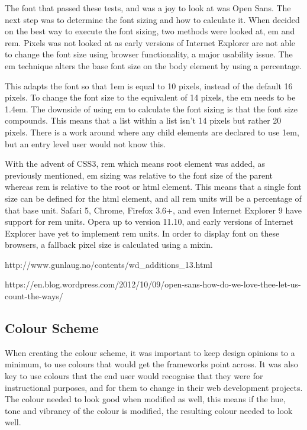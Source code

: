 The font that passed these tests, and was a joy to look at was Open Sans. The next step was to determine the font sizing and how to calculate it. When decided on the best way to execute the font sizing, two methods were looked at, em and rem. Pixels was not looked at as early versions of Internet Explorer are not able to change the font size using browser functionality, a major usability issue. The em technique alters the base font size on the body element by using a percentage. 

This adapts the font so that 1em is equal to 10 pixels, instead of the default 16 pixels. To change the font size to the equivalent of 14 pixels, the em needs to be 1.4em. The downside of using em to calculate the font sizing is that the font size compounds. This means that a list within a list isn't 14 pixels but rather 20 pixels. There is a work around where any child elements are declared to use 1em, but an entry level user would not know this. 

With the advent of CSS3, rem which means root element was added, as previously mentioned, em sizing was relative to the font size of the parent whereas rem is relative to the root or html element. This means that a single font size can be defined for the html element, and all rem units will be a percentage of that base unit. Safari 5, Chrome, Firefox 3.6+, and even Internet Explorer 9 have support for rem units. Opera up to version 11.10, and early versions of Internet Explorer have yet to implement rem units. In order to display font on these browsers, a fallback pixel size is calculated using a mixin. 


http://www.gunlaug.no/contents/wd_additions_13.html

https://en.blog.wordpress.com/2012/10/09/open-sans-how-do-we-love-thee-let-us-count-the-ways/


\subsection{Colour Scheme}
When creating the colour scheme, it was important to keep design opinions to a minimum, to use colours that would get the frameworks point across. It was also key to use colours that the end user would recognise that they were for instructional purposes, and for them to change in their web development projects. The colour needed to look good when modified as well, this means if the hue, tone and vibrancy of the colour is modified, the resulting colour needed to look well. 

